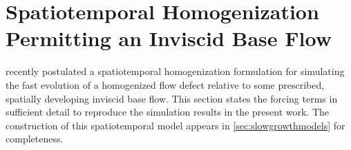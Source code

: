 \section[Spatiotemporal Homogenization Permitting an Inviscid Base Flow]
        {Spatiotemporal Homogenization\\Permitting an Inviscid Base Flow}
\label{sec:imposing_fpg}

\citet{Topalian2014Spatiotemporal} recently postulated a spatiotemporal
homogenization formulation for simulating the fast evolution of a homogenized
flow defect relative to some prescribed, spatially developing inviscid base
flow.
%
This section states the forcing terms in sufficient detail to reproduce
the simulation results in the present work.  The construction
of this spatiotemporal model appears in \autoref{sec:slowgrowthmodels} for
completeness.

